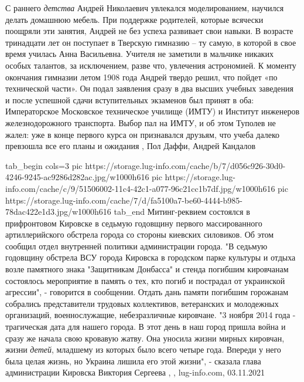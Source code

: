 С раннего \emph{детства} Андрей Николаевич увлекался моделированием, научился делать
домашнюю мебель. При поддержке родителей, которые всячески поощряли эти
занятия, Андрей не без успеха развивает свои навыки. В возрасте тринадцати лет
он поступает в Тверскую гимназию – ту самую, в которой в свое время училась
Анна Васильевна. Учителя не заметили в мальчике никаких особых талантов, за
исключением, разве что, увлечения астрономией. К моменту окончания гимназии
летом 1908 года Андрей твердо решил, что пойдет «по технической части». Он
подал заявления сразу в два высших учебных заведения и после успешной сдачи
вступительных экзаменов был принят в оба: Императорское Московское техническое
училище (ИМТУ) и Институт инженеров железнодорожного транспорта. Выбор пал на
ИМТУ, и об этом Туполев не жалел: уже в конце первого курса он признавался
друзьям, что учеба далеко превзошла все его планы и ожидания
, Пол Даффи, Андрей Кандалов

\ifcmt
  tab_begin cols=3
     pic https://storage.lug-info.com/cache/b/7/d056c926-30d0-4246-9245-ac9286d282ac.jpg/w1000h616
     pic https://storage.lug-info.com/cache/c/9/51506002-11c4-42c1-a077-96c21cc1b7df.jpg/w1000h616
     pic https://storage.lug-info.com/cache/7/d/fa5100a7-be60-4444-b985-78dac422e1d3.jpg/w1000h616
  tab_end
\fi
Митинг-реквием состоялся в прифронтовом Кировске в седьмую годовщину первого
массированного артиллерийского обстрела города со стороны киевских силовиков.
Об этом сообщил отдел внутренней политики администрации города.  "В седьмую
годовщину обстрела ВСУ города Кировска в городском парке культуры и отдыха
возле памятного знака "Защитникам Донбасса" и стенда погибшим кировчанам
состоялось мероприятие в память о тех, кто погиб и пострадал от украинской
агрессии", - говорится в сообщении.  Отдать дань памяти погибшим горожанам
собрались представители трудовых коллективов, ветеранских и молодежных
организаций, военнослужащие, небезразличные кировчане.  "3 ноября 2014 года -
трагическая дата для нашего города. В этот день в наш город пришла война и
сразу же начала свою кровавую жатву. Она уносила жизни мирных кировчан, жизни
\emph{детей}, младшему из которых было всего четыре года.  Впереди у него была целая
жизнь, но Украина лишила его этой жизни", - сказала глава администрации
Кировска Виктория Сергеева
, 
, lug-info.com, 03.11.2021

